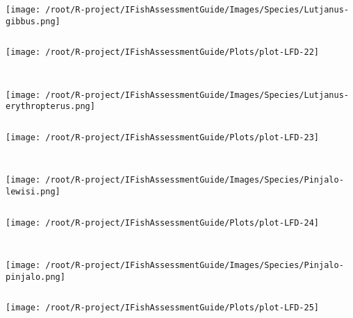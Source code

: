 \begin{knitrout}
\begin{kframe}
\begin{verbatim}
\end{verbatim}
\end{kframe}
\texttt{[image: /root/R-project/IFishAssessmentGuide/Images/Species/Lutjanus-gibbus.png]}
\begin{kframe}\begin{verbatim}
\end{verbatim}
\end{kframe}
\texttt{[image: /root/R-project/IFishAssessmentGuide/Plots/plot-LFD-22]} 
\begin{kframe}\begin{verbatim}
 
\end{verbatim}
\end{kframe}
\texttt{[image: /root/R-project/IFishAssessmentGuide/Images/Species/Lutjanus-erythropterus.png]}
\begin{kframe}\begin{verbatim}
\end{verbatim}
\end{kframe}
\texttt{[image: /root/R-project/IFishAssessmentGuide/Plots/plot-LFD-23]} 
\begin{kframe}\begin{verbatim}
 
\end{verbatim}
\end{kframe}
\texttt{[image: /root/R-project/IFishAssessmentGuide/Images/Species/Pinjalo-lewisi.png]}
\begin{kframe}\begin{verbatim}
\end{verbatim}
\end{kframe}
\texttt{[image: /root/R-project/IFishAssessmentGuide/Plots/plot-LFD-24]} 
\begin{kframe}\begin{verbatim}
 
\end{verbatim}
\end{kframe}
\texttt{[image: /root/R-project/IFishAssessmentGuide/Images/Species/Pinjalo-pinjalo.png]}
\begin{kframe}\begin{verbatim}
\end{verbatim}
\end{kframe}
\texttt{[image: /root/R-project/IFishAssessmentGuide/Plots/plot-LFD-25]} 
\begin{kframe}\begin{verbatim}
 

\end{verbatim}
\end{kframe}
\end{knitrout}
